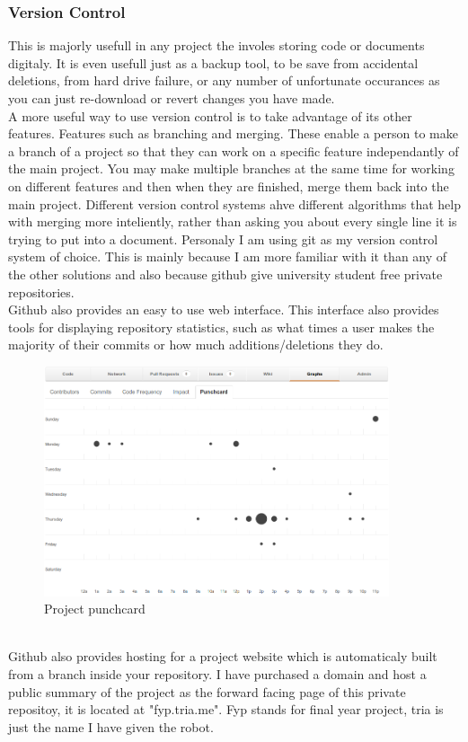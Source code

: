 \documentclass[11pt,fleqn,twoside]{article}
\begin{document}
\subsubsection{Version Control}
This is majorly usefull in any project the involes storing code or documents digitaly.  It is even usefull just as a backup tool, to be save from accidental deletions, from hard drive failure, or any number of unfortunate occurances as you can just re-download or revert changes you have made.
\\A more useful way to use version control is to take advantage of its other features.  Features such as branching and merging.  These enable a person to make a branch of a project so that they can work on a specific feature independantly of the main project.  You may make multiple branches at the same time for working on different features and then when they are finished, merge them back into the main project.  Different version control systems ahve different algorithms that help with merging more inteliently, rather than asking you about every single line it is trying to put into a document.  Personaly I am using git as my version control system of choice.  This is mainly because I am more familiar with it than any of the other solutions and also because github\cite{github} %
give university student free private repositories.
\\Github also provides an easy to use web interface.  This interface also provides tools for displaying repository statistics, such as what times a user makes the majority of their commits or how much additions/deletions they do.
\begin{figure}[h]
\centering
        \includegraphics[width=4.0in] {figures/punchcard.png}
        \caption{Project punchcard}
        \label{Project punchcard}
\end{figure}
\\Github also provides hosting for a project website which is automaticaly built from a branch inside your repository.  I have purchased a domain and host a public summary of the project as the forward facing page of this private repositoy, it is located at "fyp.tria.me".  Fyp stands for final year project, tria is just the name I have given the robot.
\clearpage
\end{document}
